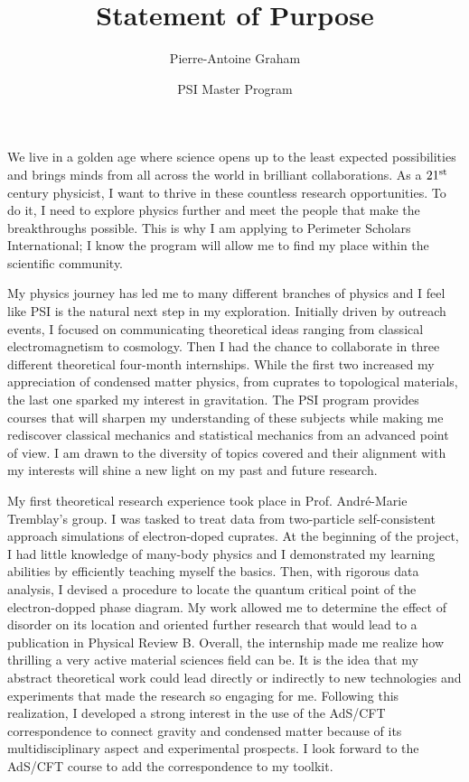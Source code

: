 \documentclass[12pt]{article}
\title{Statement of Purpose}
\author{Pierre-Antoine Graham}
\date{PSI Master Program}
\begin{document}
\maketitle
\vspace{0.5cm}



We live in a golden age where science opens up to the least expected possibilities and brings minds from all across the world in brilliant collaborations. As a $21^{\rm st}$ century physicist, I want to thrive in these countless research opportunities. To do it, I need to explore physics further and meet the people that make the breakthroughs possible. This is why I am applying to Perimeter Scholars International; I know the program will allow me to find my place within the scientific community. \vspace{0.3cm}   

My physics journey has led me to many different branches of physics and I feel like PSI is the natural next step in my exploration. Initially driven by outreach events, I focused on communicating theoretical ideas ranging from classical electromagnetism to cosmology. Then I had the chance to collaborate in three different theoretical four-month internships. While the first two increased my appreciation of condensed matter physics, from cuprates to topological materials, the last one sparked my interest in gravitation. The PSI program provides courses that will sharpen my understanding of these subjects while making me rediscover classical mechanics and statistical mechanics from an advanced point of view. I am drawn to the diversity of topics covered and their alignment with my interests will shine a new light on my past and future research.


\vspace{0.3cm}


My first theoretical research experience took place in Prof. André-Marie Tremblay's group. I was tasked to treat data from two-particle self-consistent approach simulations of electron-doped cuprates. At the beginning of the project, I had little knowledge of many-body physics and I demonstrated my learning abilities by efficiently teaching myself the basics. Then, with rigorous data analysis, I devised a procedure to locate the quantum critical point of the electron-dopped phase diagram. My work allowed me to determine the effect of disorder on its location and oriented further research that would lead to a publication in Physical Review B. Overall, the internship made me realize how thrilling a very active material sciences field can be. It is the idea that my abstract theoretical work could lead directly or indirectly to new technologies and experiments that made the research so engaging for me. Following this realization, I developed a strong interest in the use of the AdS/CFT correspondence to connect gravity and condensed matter because of its multidisciplinary aspect and experimental prospects. I look forward to the AdS/CFT course to add the correspondence to my toolkit. 
\end{document}
